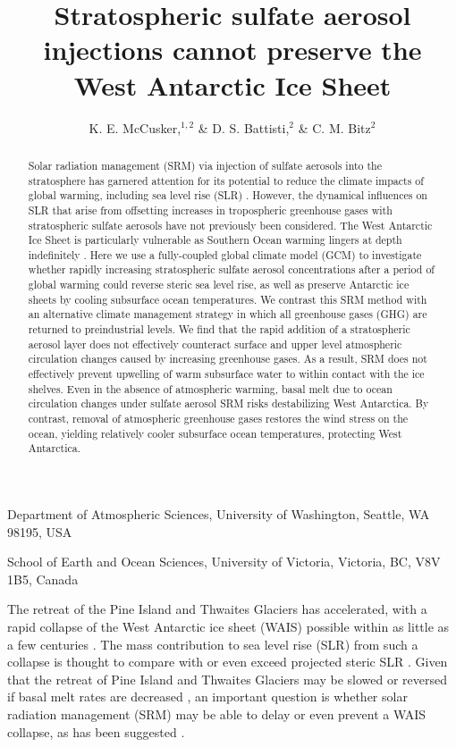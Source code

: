\documentclass{nature}
\title{Stratospheric sulfate aerosol injections cannot preserve the West Antarctic Ice Sheet} %
\author{K. E. McCusker,$^{1,2}$ \& D. S. Battisti,$^{2}$ \& C. M. Bitz$^2$}
\begin{document}
\maketitle

\begin{affiliations}
 \item Department of Atmospheric Sciences, University of Washington, Seattle, WA 98195, USA
 \item School of Earth and Ocean Sciences, University of Victoria, Victoria, BC, V8V 1B5, Canada
\end{affiliations}


\begin{abstract}

Solar radiation management (SRM) via injection of sulfate aerosols into the stratosphere has garnered attention for its potential to reduce the climate impacts of global warming, including sea level rise (SLR) \cite{moore10,irvine12}. However, the dynamical influences on SLR that arise from offsetting increases in tropospheric greenhouse gases with stratospheric sulfate aerosols \cite{ammann10} have not previously been considered. The West Antarctic Ice Sheet is particularly vulnerable as Southern Ocean warming lingers at depth indefinitely \cite{gillett11}. Here we use a fully-coupled global climate model (GCM) to investigate whether rapidly increasing stratospheric sulfate aerosol concentrations after a period of global warming could reverse steric sea level rise, as well as preserve Antarctic ice sheets by cooling subsurface ocean temperatures. We contrast this SRM method with an alternative climate management strategy in which all greenhouse gases (GHG) are returned to preindustrial levels. We find that the rapid addition of a stratospheric aerosol layer does not effectively counteract surface and upper level atmospheric circulation changes caused by increasing greenhouse gases. As a result, SRM does not effectively prevent upwelling of warm subsurface water to within contact with the ice shelves. Even in the absence of atmospheric warming, basal melt due to ocean circulation changes under sulfate aerosol SRM risks destabilizing West Antarctica. By contrast, removal of atmospheric greenhouse gases restores the wind stress on the ocean, yielding relatively cooler subsurface ocean temperatures, protecting West Antarctica. 

\end{abstract}

The retreat of the Pine Island and Thwaites Glaciers has accelerated, with a rapid collapse of the West Antarctic ice sheet (WAIS) possible within as little as a few centuries \cite{joughin14,rignot14,favier14}. The mass contribution to sea level rise (SLR) from such a collapse is thought to compare with or even exceed projected steric SLR \cite{church13}. Given that the retreat of Pine Island and Thwaites Glaciers may be slowed or reversed if basal melt rates are decreased \cite{favier14}, an important question is whether solar radiation management (SRM) may be able to delay or even prevent a WAIS collapse, as has been suggested \cite{blackstock09}.
\end{document}
